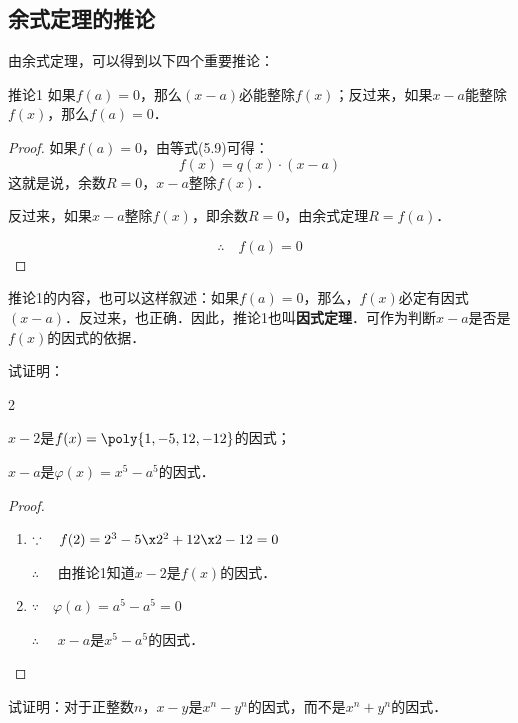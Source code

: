 \subsection{余式定理的推论}
由余式定理，可以得到以下四个重要推论：
\begin{blk}{推论1}
    如果$f(a)=0$，那么$(x-a)$必能整除$f(x)$；反过来，如果$x-a$能整除$f(x)$，那么$f(a)=0$．
\end{blk}

\begin{proof}
    如果$f(a)=0$，由等式(5.9)可得：
    \[f(x)=q(x) \cdot (x-a)\]    
    这就是说，余数$R=0$，$x-a$整除$f(x)$．
    
    反过来，如果$x-a$整除$f(x)$，即余数$R=0$，由余式定理$R=f(a)$．
    
$$\therefore\quad f (a) =0$$
\end{proof}

推论1的内容，也可以这样叙述：如果$f(a)=0$，那么，$f(x)$必定有因式$(x-a)$．反过来，也正确．因此，推论1也叫\textbf{因式定理}．可作为判断$x-a$是否是$f(x)$的因式的依据．

\begin{example}
    试证明：
\begin{enumerate}
    \begin{multicols}{2}
    \item $x-2$是$f(x)=\poly{1,-5,12,-12}$的因式；\quad
    \item $x-a$是$\varphi(x)=x^5-a^5$的因式．
    \end{multicols}
\end{enumerate}
\end{example}

\begin{proof}
\begin{enumerate}
    \item $\because\quad f(2)=2^3-5\x 2^2+12\x2-12=0$
    
    $\therefore\quad $ 由推论1知道$x-2$是$f(x)$的因式．
    \item $\because\quad \varphi(a)=a^5-a^5=0$
    
    $\therefore\quad $ $x-a$是$x^5-a^5$的因式．
\end{enumerate}

\end{proof}

\begin{example}
试证明：对于正整数$n$，$x-y$是$x^n-y^n$的因式，而不是$x^n+y^n$的因式．
\end{example}

